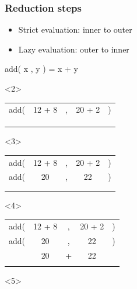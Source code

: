 \documentclass[17pt]{beamer}
\renewcommand{\(}[1]{\begin{columns}[#1]}
\renewcommand{\)}{\end{columns}}
\newcommand{\<}[1]{\begin{column}{#1}}
\renewcommand{\>}{\end{column}}
\begin{document}
\begin{frame}
  \frametitle{Reduction steps}
  \begin{itemize}
  \item<1-> Strict evaluation: inner to outer
  \item<6-> Lazy evaluation: outer to inner
  \end{itemize}
  \begin{center}
    add( x , y ) = x + y
  \end{center}

  \begin{minipage}[t][.7\textheight]{\textwidth}
  \begin{center}
    \begin{onlyenv}<2>
      \begin{tabular}{ c c c c c }
        \\ add( & 12 + 8 & ,              & 20 + 2 & )
        \\      &        &                &        &
        \\      &        &                &        &
        \\      &        & \phantom{42}   &        &
      \end{tabular}
    \end{onlyenv}
    \begin{onlyenv}<3>
      \begin{tabular}{ c c c c c }
        \\ add( & 12 + 8 & ,              & 20 + 2 & )
        \\ add( & 20     & ,              & 22     & )
        \\      &        &                &        &
        \\      &        & \phantom{42}   &        &
      \end{tabular}
    \end{onlyenv}
    \begin{onlyenv}<4>
      \begin{tabular}{ c c c c c }
        \\ add( & 12 + 8 & ,              & 20 + 2 & )
        \\ add( & 20     & ,              & 22     & )
        \\      & 20     & +              & 22     &
        \\      &        & \phantom{42}   &        &
      \end{tabular}
    \end{onlyenv}
    \begin{onlyenv}<5>

\end{onlyenv}
\end{center}
\end{minipage}
\end{frame}
\end{document}
